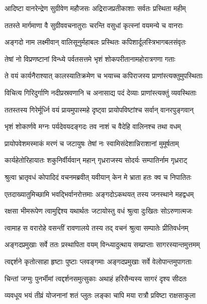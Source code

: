 \twolineshloka
{आदिष्टा वानरेन्द्रेण सुग्रीवेण महौजसः}
{अद्रिराजप्रतीकाशाः सर्वतः प्रस्थिता महीम्} %

\twolineshloka
{ततस्ते मार्गमाणा वै सुग्रीववचनातुराः}
{चरन्ति वसुधां कृत्स्नां वयमन्ये च वानराः} %

\twolineshloka
{अङ्गदो नाम लक्ष्मीवान् वालिसूनुर्महाबलः}
{प्रस्थितः कपिशार्दूलस्त्रिभागबलसंवृतः} %

\twolineshloka
{तेषां नो विप्रणष्टानां विन्ध्ये पर्वतसत्तमे}
{भृशं शोकपरीतानामहोरात्रगणा गताः} %

\twolineshloka
{ते वयं कार्यनैराश्यात् कालस्यातिक्रमेण च}
{भयाच्च कपिराजस्य प्राणांस्त्यक्तुमुपस्थिताः} %

\twolineshloka
{विचित्य गिरिदुर्गाणि नदीप्रस्रवणानि च}
{अनासाद्य पदं देव्याः प्राणांस्त्यक्तुं व्यवस्थिताः} %

\twolineshloka
{ततस्तस्य गिरेर्मूर्ध्नि वयं प्रायमुपास्महे}
{दृष्ट्वा प्रायोपविष्टांश्च सर्वान् वानरपुङ्गवान्} %

\twolineshloka
{भृशं शोकार्णवे मग्नः पर्यदेवयदङ्गदः}
{तव नाशं च वैदेहि वालिनश्च तथा वधम्} %

\twolineshloka
{प्रायोपवेशमस्माकं मरणं च जटायुषः}
{तेषां नः स्वामिसंदेशान्निराशानां मुमूर्षताम्} %

\twolineshloka
{कार्यहेतोरिहायातः शकुनिर्वीर्यवान् महान्}
{गृध्रराजस्य सोदर्यः सम्पातिर्नाम गृध्रराट्} %

\twolineshloka
{श्रुत्वा भ्रातृवधं कोपादिदं वचनमब्रवीत्}
{यवीयान् केन मे भ्राता हतः क्व च निपातितः} %

\twolineshloka
{एतदाख्यातुमिच्छामि भवद्भिर्वानरोत्तमाः}
{अङ्गदोऽकथयत् तस्य जनस्थाने महद्वधम्} %

\twolineshloka
{रक्षसा भीमरूपेण त्वामुद्दिश्य यथार्थतः}
{जटायोस्तु वधं श्रुत्वा दुःखितः सोऽरुणात्मजः} %

\twolineshloka
{त्वामाह स वरारोहे वसन्तीं रावणालये}
{तस्य तद् वचनं श्रुत्वा सम्पातेः प्रीतिवर्धनम्} %

\twolineshloka
{अङ्गदप्रमुखाः सर्वे ततः प्रस्थापिता वयम्}
{विन्ध्यादुत्थाय सम्प्राप्ताः सागरस्यान्तमुत्तमम्} %

\twolineshloka
{त्वद्दर्शने कृतोत्साहा हृष्टाः पुष्टाः प्लवङ्गमाः}
{अङ्गदप्रमुखाः सर्वे वेलोपान्तमुपागताः} %

\twolineshloka
{चिन्तां जग्मुः पुनर्भीमां त्वद्दर्शनसमुत्सुकाः}
{अथाहं हरिसैन्यस्य सागरं दृश्य सीदतः} %

\twolineshloka
{व्यवधूय भयं तीव्रं योजनानां शतं प्लुतः}
{लङ्का चापि मया रात्रौ प्रविष्टा राक्षसाकुला} %

